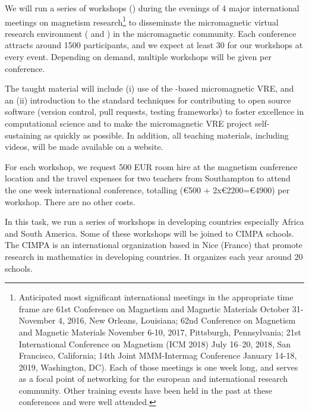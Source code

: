\begin{workpackage}
\begin{tasklist}
\begin{task}[title=Micromagnetic VRE dissemination workshops,
id=dissemination-of-oommf-nb-workshops,lead=USO,PM=6]
We will run a series of workshops
() during the evenings of 4 major
international meetings on magnetism research\footnote{Anticipated most
  significant international meetings in the appropriate time frame are
  61st Conference on Magnetism and Magnetic Materials October
  31-November 4, 2016, New Orleans, Louisiana; 62nd Conference on
  Magnetism and Magnetic Materials November 6-10, 2017, Pittsburgh,
  Pennsylvania; 21st International Conference on Magnetism (ICM 2018)
  July 16–20, 2018, San Francisco, California; 14th Joint MMM-Intermag
  Conference January 14-18, 2019, Washington, DC). Each of those
  meetings is one week long, and serves as a focal point of networking
  for the european and international research community. Other training events have been held in the
past at these conferences and were well attended.} to
disseminate the micromagnetic virtual research environment
( and
) in the
micromagnetic community. Each conference
attracts around 1500 participants, and we expect at least 30 for our
workshops at every event. Depending on demand, multiple workshops
will be given per conference. 

The taught material will include (i) use of the \Jupyter-based
micromagnetic VRE, and an (ii) introduction to the standard techniques
for contributing to open source software (version control, pull
requests, testing frameworks) to foster excellence in computational
science and to make the micromagnetic VRE project self-sustaining as quickly
as possible. In addition, all teaching materials, including videos,
will be made available on a website.

For each workshop, we request 500 EUR room hire at the magnetism conference
location and the travel expenses for two teachers from Southampton to
attend the one week international conference, totalling (\euro{500} +
2x\euro{2200}=\euro{4900}) per workshop. There are no other costs.
\end{task}

\begin{task}[title=Workshops in developing countries]
In this task, we run a series of workshops in developing countries especially
Africa and South America. Some of these workshops will be joined to CIMPA schools.
The CIMPA is an international organization based in Nice (France) that promote
research in mathematics in developing countries. It organizes each year around
20 schools.


\end{task}
\end{tasklist}
\end{workpackage}
